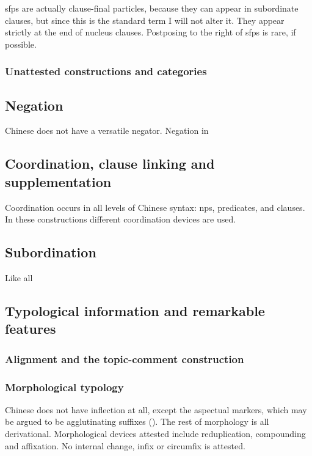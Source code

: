 \documentclass[UTF8, a4paper, oneside, scheme=plain]{ctexart}
\begin{document}
\ac{sfp}s are actually clause-final particles,
because they can appear in subordinate clauses,
but since this is the standard term I will not alter it.
They appear strictly at the end of nucleus clauses.
Postposing to the right of \ac{sfp}s is rare, if possible.

\subsubsection{Unattested constructions and categories}

\subsection{Negation}

Chinese does not have a versatile negator.
Negation in 

\subsection{Coordination, clause linking and supplementation}

Coordination occurs in all levels of Chinese syntax:
\ac{np}s, predicates, and clauses.
In these constructions different coordination devices are used.

\subsection{Subordination}

Like all 

\subsection{Typological information and remarkable features}

\subsubsection{Alignment and the topic-comment construction}


\subsubsection{Morphological typology}

Chinese does not have inflection at all,
except the aspectual markers,
which may be argued to be agglutinating suffixes ().
The rest of morphology is all derivational.
Morphological devices attested include 
reduplication, compounding and affixation.
No internal change, infix or circumfix is attested.
\end{document}
